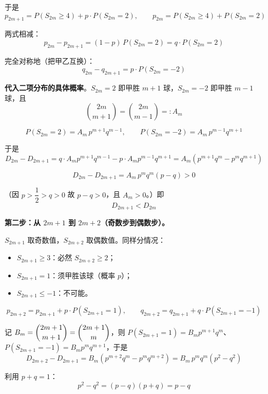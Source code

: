 \begin{answer}
于是
\nopagebreak[4]
\[p_{2m+1}=P\left(S_{2m}\ge4\right)+p\cdot P\left(S_{2m}=2\right),\qquad p_{2m}=P\left(S_{2m}\ge4\right)+P\left(S_{2m}=2\right)\]

两式相减：
\nopagebreak[4]
\[p_{2m}-p_{2m+1}=(1-p)\,P\left(S_{2m}=2\right)=q\cdot P\left(S_{2m}=2\right)\]

完全对称地（把甲乙互换）：
\nopagebreak[4]
\[q_{2m}-q_{2m+1}=p\cdot P\left(S_{2m}=-2\right)\]

\textbf{代入二项分布的具体概率}。$S_{2m}=2$ 即甲胜 $m+1$ 球，$S_{2m}=-2$ 即甲胜 $m-1$ 球，且
\nopagebreak[4]
\[\binom{2m}{m+1}=\binom{2m}{m-1}=:A_m\]

\nopagebreak[4]
\[P\left(S_{2m}=2\right)=A_m\,p^{m+1}q^{m-1},\qquad P\left(S_{2m}=-2\right)=A_m\,p^{m-1}q^{m+1}\]

于是
\nopagebreak[4]
\[D_{2m}-D_{2m+1}=q\cdot A_mp^{m+1}q^{m-1}-p\cdot A_mp^{m-1}q^{m+1}=A_m\left(p^{m+1}q^{m}-p^{m}q^{m+1}\right)\]

\nopagebreak[4]
\[D_{2m}-D_{2m+1}=A_m\,p^mq^m(p-q)>0\]

（因 $p>\dfrac12>q>0$ 故 $p-q>0$，且 $A_m>0$。）即
\nopagebreak[4]
\[\boxed{D_{2m+1}<D_{2m}}\tag{i}\]

\par\medskip

\textbf{第二步：从 $2m+1$ 到 $2m+2$（奇数步到偶数步）。}

$S_{2m+1}$ 取奇数值，$S_{2m+2}$ 取偶数值。同样分情况：

\begin{itemize}
\item $S_{2m+1}\ge3$：必然 $S_{2m+2}\ge2$；
\item $S_{2m+1}=1$：须甲胜该球（概率 $p$）；
\item $S_{2m+1}\le-1$：不可能。
\end{itemize}

\nopagebreak[4]
\[p_{2m+2}=p_{2m+1}+p\cdot P\left(S_{2m+1}=1\right),\qquad q_{2m+2}=q_{2m+1}+q\cdot P\left(S_{2m+1}=-1\right)\]

记 $B_m=\dbinom{2m+1}{m+1}=\dbinom{2m+1}{m}$，则 $P\left(S_{2m+1}=1\right)=B_mp^{m+1}q^m$、$P\left(S_{2m+1}=-1\right)=B_mp^mq^{m+1}$，于是
\nopagebreak[4]
\[D_{2m+2}-D_{2m+1}=B_m\left(p^{m+2}q^m-p^mq^{m+2}\right)=B_m\,p^mq^m\left(p^2-q^2\right)\]

利用 $p+q=1$：
\nopagebreak[4]
\[p^2-q^2=(p-q)(p+q)=p-q\]


\end{answer}
